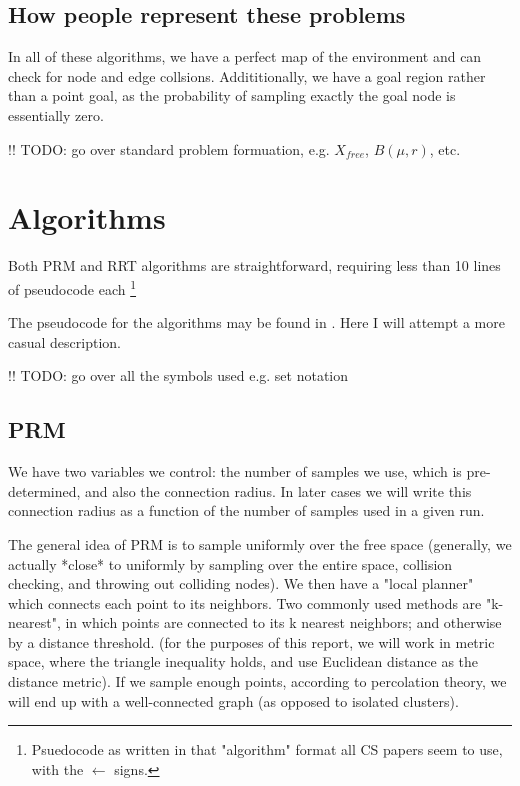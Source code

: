 \documentclass[a4paper]{article}
\begin{document}
\subsection{How people represent these problems}

In all of these algorithms, we have a perfect map of the environment and can
check for node and edge collsions. Addititionally, we have a goal region rather
than a point goal, as the probability of sampling exactly the goal node is
essentially zero.

!! TODO: go over standard problem formuation, e.g. $X_{free}$, $B(\mu, r)$, etc. %

\section{Algorithms}

Both PRM and RRT algorithms are straightforward, requiring less than 10
lines of pseudocode each \footnote{Psuedocode as written in that "algorithm"
format all CS papers seem to use, with the $\gets$ signs.} 

The pseudocode for the algorithms may be found in \cite{RRT*}. Here I will
attempt a more casual description. 


!! TODO: go over all the symbols used e.g. set notation %

\subsection{PRM}

We have two variables we control: the number of samples we use, which is
pre-determined, and also the connection radius. In later cases we will write
this connection radius as a function of the number of samples used in a
given run. 

The general idea of PRM is to sample uniformly over the free space (generally,
we actually *close* to uniformly by sampling over the entire space, collision
checking, and throwing out colliding nodes). We then have a "local planner"
which connects each point to its neighbors. Two commonly used methods are
"k-nearest", in which points are connected to its k nearest neighbors; and
otherwise by a distance threshold. (for the purposes of this report, we will
work in metric space, where the triangle inequality holds, and use Euclidean
distance as the distance metric). If we sample enough points, according to percolation
theory, we will end up with a well-connected graph (as opposed to isolated
clusters).
\end{document}
